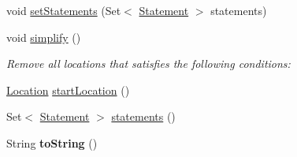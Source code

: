\begin{DoxyCompactItemize}
\item 
void \hyperlink{classedu_1_1udel_1_1cis_1_1vsl_1_1civl_1_1model_1_1common_1_1CommonFunction_a5a4fec747a1f9785c446b594be8028fa}{set\+Statements} (Set$<$ \hyperlink{interfaceedu_1_1udel_1_1cis_1_1vsl_1_1civl_1_1model_1_1IF_1_1statement_1_1Statement}{Statement} $>$ statements)
\item 
void \hyperlink{classedu_1_1udel_1_1cis_1_1vsl_1_1civl_1_1model_1_1common_1_1CommonFunction_a16e30c063a7d30159c10fda956cea0c4}{simplify} ()
\begin{DoxyCompactList}\small\item\em Remove all locations that satisfies the following conditions\+: \end{DoxyCompactList}\item 
\hyperlink{interfaceedu_1_1udel_1_1cis_1_1vsl_1_1civl_1_1model_1_1IF_1_1location_1_1Location}{Location} \hyperlink{classedu_1_1udel_1_1cis_1_1vsl_1_1civl_1_1model_1_1common_1_1CommonFunction_a85bcd29becfdddf7e24134915c7d0d53}{start\+Location} ()
\item 
Set$<$ \hyperlink{interfaceedu_1_1udel_1_1cis_1_1vsl_1_1civl_1_1model_1_1IF_1_1statement_1_1Statement}{Statement} $>$ \hyperlink{classedu_1_1udel_1_1cis_1_1vsl_1_1civl_1_1model_1_1common_1_1CommonFunction_a1e05e3be53d64e8ad5157d5849d5fdf1}{statements} ()
\item 
\hypertarget{classedu_1_1udel_1_1cis_1_1vsl_1_1civl_1_1model_1_1common_1_1CommonFunction_a57f6443c06f3af33952995336c05be60}{}String {\bfseries to\+String} ()\label{classedu_1_1udel_1_1cis_1_1vsl_1_1civl_1_1model_1_1common_1_1CommonFunction_a57f6443c06f3af33952995336c05be60}


\end{DoxyCompactItemize}
